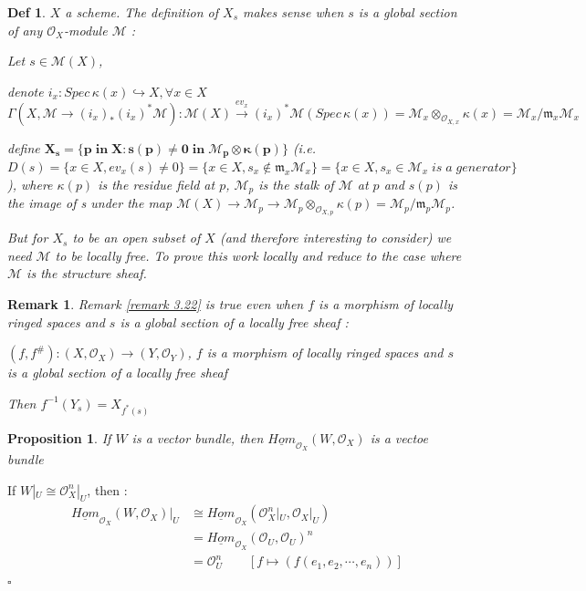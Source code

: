 \documentclass{article}
\newtheorem{definition}[theorem]{Def}
\newtheorem{proposition}[theorem]{Proposition}
\newtheorem{remark}[theorem]{Remark}
\newenvironment{Proof}{{\noindent \indent \it Proof:\quad}}{\hfill $\square$\par}
\begin{document}
\begin{definition}
$X$ a scheme. The definition of $X_s$ makes sense when $s$ is a global section of any $\mathcal O_X$-module $\mathcal M$ :



Let $s\in \mathcal M(X)$, 

denote $i_x:Spec\,\kappa(x)\hookrightarrow X,\forall x\in X$
$$
\Gamma(X, \mathcal M\to (i_x)_\ast(i_x)^\ast\mathcal M): \mathcal M(X)\xrightarrow{ev_x} (i_x)^\ast \mathcal M(Spec\,\kappa(x))
=\mathcal M_x \otimes_{\mathcal O_{X,x}} \kappa(x)
=\mathcal M_x/\mathfrak m_x \mathcal M_x
$$

define $\bm{X_s = \{ p\; in\; X : s(p) \ne 0\; in\; \mathcal M_p \otimes \kappa(p) \}}$ 
(i.e. $D(s)
=\{x\in X,ev_x(s)\ne 0\}
=\{x\in X,s_x\notin \mathfrak m_x\mathcal M_x\}
=\{x\in X,s_x\in \mathcal M_x\;is\;a\;generator\}$), where $\kappa(p)$ is the residue field at $p$, $\mathcal M_p$ is the stalk of $\mathcal M$ at $p$ and $s(p)$ is the image of s under the map $\mathcal M(X) \to \mathcal M_p \to \mathcal M_p \otimes_{\mathcal O_{X,p}} \kappa(p)=\mathcal M_p/\mathfrak m_p \mathcal M_p$.

But for $X_s$ to be an open subset of $X$ (and therefore interesting to consider) we need $\mathcal M$ to be locally free. To prove this work locally and reduce to the case where $\mathcal M$ is the structure sheaf.
\end{definition}

\begin{remark}
    Remark \ref{remark 3.22} is true even when $f$ is a morphism of locally ringed spaces and $s$ is a global section of a locally free sheaf :

$(f,f^{\#}):(X,\mathcal O_X)\to(Y,\mathcal O_Y)$, $f$ is a morphism of locally ringed spaces and $s$ is a global section of a locally free sheaf

Then
$f^{-1}(Y_s)= 
X_{f^{\ast}(s)}$
\end{remark}

\begin{proposition}
    If $W$ is a vector bundle, then $\underline{Hom}_{\mathcal O_X}(W,\mathcal O_X)$ is a vectoe bundle
\end{proposition}
\begin{Proof}
    If $W|_U\cong \mathcal O_X^n|_U$, then :
\begin{align*}
\label{sup}
\underline{Hom}_{\mathcal O_X}(W,\mathcal O_X)|_U
&\cong \underline{Hom}_{\mathcal O_X}(\mathcal O_X^n|_U,\mathcal O_X|_U)\\
&=\underline{Hom}_{\mathcal O_X}(\mathcal O_U,\mathcal O_U)^n\\
&=\mathcal O_U^n\quad\quad
[f\mapsto (f(e_1,e_2,\cdots,e_n))]
 \end{align*}
\end{Proof}
\end{document}
